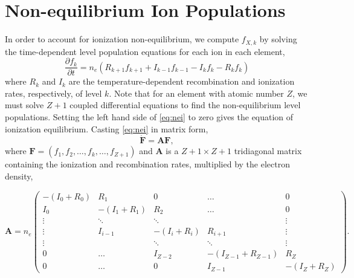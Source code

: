 \section{Non-equilibrium Ion Populations}\label{nei}

In order to account for ionization non-equilibrium, we compute $f_{X,k}$ by solving the time-dependent level population equations for each ion in each element,
\begin{equation}\label{eq:nei}
    \frac{\partial f_k}{\partial t} = n_e(R_{k+1}f_{k+1} + I_{k-1}f_{k-1} - I_kf_k - R_kf_k)
\end{equation}
where $R_k$ and $I_k$ are the temperature-dependent recombination and ionization rates, respectively, of level $k$. Note that for an element with atomic number $Z$, we must solve $Z+1$ coupled differential equations to find the non-equilibrium level populations. Setting the left hand side of \autoref{eq:nei} to zero gives the equation of ionization equilibrium. Casting \autoref{eq:nei} in matrix form,
\begin{equation}\label{eq:nei_mat}
    \dot{\mathbf{F}} = \mathbf{A}\mathbf{F},
\end{equation}
where $\mathbf{F}=(f_1,f_2,\ldots,f_k,\ldots,f_{Z+1})$ and $\mathbf{A}$ is a ${Z+1\times Z+1}$ tridiagonal matrix containing the ionization and recombination rates, multiplied by the electron density,

\begin{equation}
    \mathbf{A} = n_e
        \begin{pmatrix}
            -(I_0 + R_0) & R_1 & 0 & \dots & 0 \\
            I_0 & -(I_1 + R_1) & R_2 & \dots & 0 \\
            \vdots & \ddots & \ddots & & \vdots \\
            \vdots & I_{i-1} & -(I_i + R_i) & R_{i+1} & \vdots \\
            \vdots & & \ddots & \ddots & \vdots \\
            0 & \dots & I_{Z-2} & -(I_{Z-1} + R_{Z-1}) & R_Z \\
            0 & \dots & 0 & I_{Z-1} & -(I_Z + R_Z) 
        \end{pmatrix}.
\end{equation}


